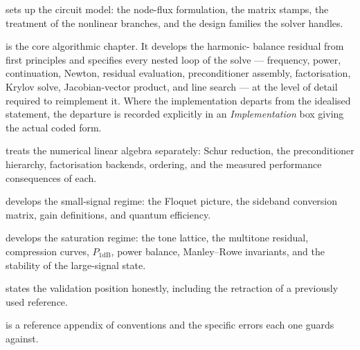  sets up the circuit model: the node-flux formulation, the
matrix stamps, the treatment of the nonlinear branches, and the design families
the solver handles.

 is the core algorithmic chapter. It develops the harmonic-
balance residual from first principles and specifies every nested loop of the
solve --- frequency, power, continuation, Newton, residual evaluation,
preconditioner assembly, factorisation, Krylov solve, Jacobian-vector product,
and line search --- at the level of detail required to reimplement it. Where
the implementation departs from the idealised statement, the departure is
recorded explicitly in an \emph{Implementation} box giving the actual coded
form.

 treats the numerical linear algebra separately: Schur
reduction, the preconditioner hierarchy, factorisation backends, ordering, and
the measured performance consequences of each.

 develops the small-signal regime: the Floquet picture, the
sideband conversion matrix, gain definitions, and quantum efficiency.

 develops the saturation regime: the tone lattice, the
multitone residual, compression curves, $P_{1\mathrm{dB}}$, power balance,
Manley--Rowe invariants, and the stability of the large-signal state.

 states the validation position honestly, including the
retraction of a previously used reference.

 is a reference appendix of conventions and the specific
errors each one guards against.
